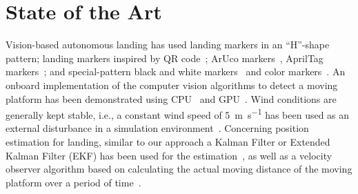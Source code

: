 \documentclass[conference]{IEEEtran}
\begin{document}
\section{State of the Art}
\label{sec:state-of-the-art}

\newcommand{\Xcite}[1]{}


Vision-based autonomous landing has used landing markers
 in an ``H''-shape
pattern; %
landing markers inspired by QR code~\cite{yuan2018hierarchical};
ArUco markers~\cite{lee2012autonomous}\Xcite{yang2018hybrid}, AprilTag markers~\cite{araar2017vision}\Xcite{kyristsis2016towards,feng2018autonomous,olson2011apriltag}; and special-pattern black and white markers~\cite{nguyen2018lightdenseyolo}\Xcite{falanga2017vision} and color markers~\cite{chen2016system}\Xcite{lee2016vision}.  
An onboard implementation of the computer vision algorithms to detect a moving platform has been demonstrated using CPU~\cite{chen2016system}\Xcite{lee2016vision,falanga2017vision} and GPU~\cite{yang2018hybrid}\Xcite{nguyen2018lightdenseyolo,kyristsis2016towards}.
% 
Wind conditions are generally kept stable, i.e.,
a constant wind speed of \SI{5}{\m \per \s} has been used as an external disturbance in a
simulation environment~\cite{feng2018autonomous}. 
%
Concerning %
position estimation for landing,
similar to our approach a Kalman Filter or Extended Kalman Filter (EKF) has been used for the
estimation~\cite{saripalli2003landing}\Xcite{araar2017vision,feng2018autonomous,
  falanga2017vision}, as well as a velocity observer algorithm based on calculating the actual
moving distance of the moving platform over a period of time~\cite{yang2018hybrid}.
\end{document}
